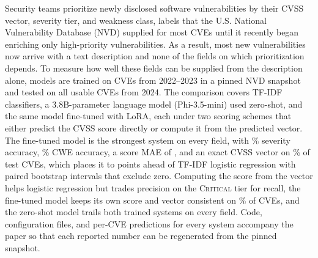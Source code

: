 Security teams prioritize newly disclosed software vulnerabilities by their CVSS vector, severity tier, and weakness class, labels that the U.S. National Vulnerability Database (NVD) supplied for most CVEs until it recently began enriching only high-priority vulnerabilities.
As a result, most new vulnerabilities now arrive with a text description and none of the fields on which prioritization depends.
To measure how well these fields can be supplied from the description alone, models are trained on CVEs from 2022--2023 in a pinned NVD snapshot and tested on all \nTest{} usable CVEs from 2024.
The comparison covers TF-IDF classifiers, a 3.8B-parameter language model (Phi-3.5-mini) used zero-shot, and the same model fine-tuned with LoRA, each under two scoring schemes that either predict the CVSS score directly or compute it from the predicted vector.
The fine-tuned model is the strongest system on every field, with \nLoRAfSev\% severity accuracy, \nLoRAfCwe\% CWE accuracy, a score MAE of \nLoRAfMae, and an exact CVSS vector on \nLoRAfVec\% of test CVEs, which places it \nDiffLRfSev{} to \nDiffLRfVec{} points ahead of TF-IDF logistic regression with paired bootstrap intervals that exclude zero.
Computing the score from the vector helps logistic regression but trades precision on the \textsc{Critical} tier for recall, the fine-tuned model keeps its own score and vector consistent on \nLoRAScoreCons\% of CVEs, and the zero-shot model trails both trained systems on every field.
Code, configuration files, and per-CVE predictions for every system accompany the paper so that each reported number can be regenerated from the pinned snapshot.
